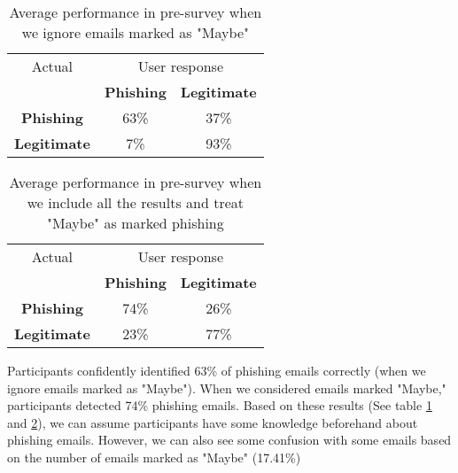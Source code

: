 \begin{table}[!ht]
    \begin{center}

        \begin{tabular}{c | c c}
            Actual              & \multicolumn{2}{c}{User response}                       \\
                                & \textbf{Phishing}                 & \textbf{Legitimate} \\
            \textbf{Phishing}   & 63\%                              & 37\%                \\
            \textbf{Legitimate} & 7\%                               & 93\%                \\
        \end{tabular}
        \caption[Average performance in pre-survey (I)]{Average performance in pre-survey when we ignore emails marked as "Maybe"}
        \label{tab:pre_survey_responses}
    \end{center}
\end{table}

\begin{table}[!ht]
    \begin{center}

        \begin{tabular}{c | c c}
            Actual              & \multicolumn{2}{c}{User response}                       \\
                                & \textbf{Phishing}                 & \textbf{Legitimate} \\
            \textbf{Phishing}   & 74\%                              & 26\%                \\
            \textbf{Legitimate} & 23\%                              & 77\%                \\
        \end{tabular}
        \caption[Average performance in pre-survey (II)]{Average performance in pre-survey when we include all the results and treat "Maybe" as marked phishing}
        \label{tab:pre_survey_responses_all}
    \end{center}
\end{table}

Participants confidently identified 63\% of phishing emails correctly (when we ignore emails marked as "Maybe"). When we considered emails marked "Maybe," participants detected 74\% phishing emails. Based on these results (See table \ref{tab:pre_survey_responses} and \ref{tab:pre_survey_responses_all}), we can assume participants have some knowledge beforehand about phishing emails. However, we can also see some confusion with some emails based on the number of emails marked as "Maybe" (17.41\%)

